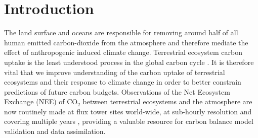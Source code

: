 \documentclass[review]{elsarticle}
\begin{document}
\linenumbers

\section{Introduction} \label{sec:intro}

The land surface and oceans are responsible for removing around half of all human emitted carbon-dioxide from the atmosphere and therefore mediate the effect of anthropogenic induced climate change. Terrestrial ecosystem carbon uptake is the least understood process in the global carbon cycle \citep{ciais2014carbon}. It is therefore vital that we improve understanding of the carbon uptake of terrestrial ecosystems and their response to climate change in order to better constrain predictions of future carbon budgets. Observations of the Net Ecosystem Exchange (NEE) of CO$_{2}$ between terrestrial ecosystems and the atmosphere are now routinely made at flux tower sites world-wide, at sub-hourly resolution and covering multiple years \citep{baldocchi2008turner}, providing a valuable resource for carbon balance model validation and data assimilation.
\end{document}
